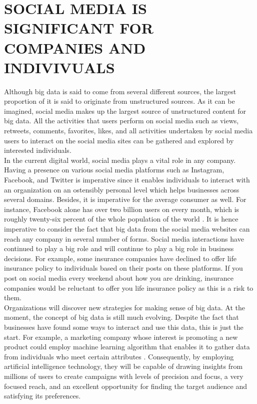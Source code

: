 \documentclass[sigconf]{acmart}
\begin{document}
\section{SOCIAL MEDIA IS SIGNIFICANT FOR COMPANIES AND INDIVIVUALS}

Although big data is said to come from several different sources, the largest proportion of it is said to originate from unstructured sources. As it can be imagined, social media makes up the largest source of unstructured content for big data. All the activities that users perform on social media such as views, retweets, comments, favorites, likes, and all activities undertaken by social media users to interact on the social media sites can be gathered and explored by interested individuals. \\
In the current digital world, social media plays a vital role in any company. Having a presence on various social media platforms such as Instagram, Facebook, and Twitter is imperative since it enables individuals to interact with an organization on an ostensibly personal level which helps businesses across several domains. Besides, it is imperative for the average consumer as well. For instance, Facebook alone has over two billion users on every month, which is roughly twenty-six percent of the whole population of the world \cite{Geer2017}. It is hence imperative to consider the fact that big data from the social media websites can reach any company in several number of forms. Social media interactions have continued to play a big role and will continue to play a big role in business decisions. For example, some insurance companies have declined to offer life insurance policy to individuals based on their posts on these platforms. If you post on social media every weekend about how you are drinking, insurance companies would be reluctant to offer you life insurance policy as this is a risk to them. \\
Organizations will discover new strategies for making sense of big data. At the moment, the concept of big data is still much evolving. Despite the fact that businesses have found some ways to interact and use this data, this is just the start. For example, a marketing company whose interest is promoting a new product could employ machine learning algorithm that enables it to gather data from individuals who meet certain attributes \cite{Geer2017}. Consequently, by employing artificial intelligence technology, they will be capable of drawing insights from millions of users to create campaigns with levels of precision and focus, a very focused reach, and an excellent opportunity for finding the target audience and satisfying its preferences. 
\end{document}
